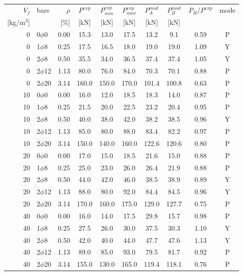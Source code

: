 \begin{tabular}{r l r ccc c cc c}
\toprule
$V_f$ & bars & $\rho$ & $P^{exp}$ & $P^{exp}_{min}$ & $P^{exp}_{max}$ & $P^{mod}_A$ & $P^{mod}_B$ & $P_B/P^{exp}$ & mode\\
{[kg/m$^3$]} & & [\%] & [kN] & [kN] & [kN] & [kN] & [kN] & & \\
\midrule
0 & 0$\phi$0 & 0.00 & 15.3 & 13.0 & 17.5 & 13.2 & 9.1 & 0.59 & P\\
0 & 1$\phi$8 & 0.25 & 17.5 & 16.5 & 18.0 & 19.0 & 19.0 & 1.09 & Y\\
0 & 2$\phi$8 & 0.50 & 35.5 & 34.0 & 36.5 & 37.4 & 37.4 & 1.05 & Y\\
0 & 2$\phi$12 & 1.13 & 80.0 & 76.0 & 84.0 & 70.3 & 70.1 & 0.88 & P\\
0 & 2$\phi$20 & 3.14 & 160.0 & 150.0 & 170.0 & 101.4 & 100.8 & 0.63 & P\\
10 & 0$\phi$0 & 0.00 & 16.0 & 12.0 & 18.5 & 18.3 & 14.0 & 0.87 & P\\
10 & 1$\phi$8 & 0.25 & 21.5 & 20.0 & 22.5 & 23.2 & 20.4 & 0.95 & P\\
10 & 2$\phi$8 & 0.50 & 40.0 & 38.0 & 42.0 & 38.2 & 38.5 & 0.96 & Y\\
10 & 2$\phi$12 & 1.13 & 85.0 & 80.0 & 88.0 & 83.4 & 82.2 & 0.97 & P\\
10 & 2$\phi$20 & 3.14 & 150.0 & 140.0 & 160.0 & 122.6 & 120.6 & 0.80 & P\\
20 & 0$\phi$0 & 0.00 & 17.0 & 15.0 & 18.5 & 21.6 & 15.0 & 0.88 & P\\
20 & 1$\phi$8 & 0.25 & 25.0 & 23.0 & 26.0 & 26.4 & 21.9 & 0.88 & P\\
20 & 2$\phi$8 & 0.50 & 44.0 & 42.0 & 46.0 & 38.5 & 38.9 & 0.89 & Y\\
20 & 2$\phi$12 & 1.13 & 88.0 & 80.0 & 92.0 & 84.4 & 84.5 & 0.96 & Y\\
20 & 2$\phi$20 & 3.14 & 170.0 & 160.0 & 175.0 & 129.0 & 127.7 & 0.75 & P\\
40 & 0$\phi$0 & 0.00 & 16.0 & 14.0 & 17.5 & 29.8 & 15.7 & 0.98 & P\\
40 & 1$\phi$8 & 0.25 & 27.5 & 26.0 & 30.0 & 37.5 & 30.3 & 1.10 & Y\\
40 & 2$\phi$8 & 0.50 & 42.0 & 40.0 & 44.0 & 47.7 & 47.6 & 1.13 & Y\\
40 & 2$\phi$12 & 1.13 & 89.0 & 85.0 & 93.0 & 79.5 & 81.7 & 0.92 & P\\
40 & 2$\phi$20 & 3.14 & 155.0 & 130.0 & 165.0 & 119.4 & 118.1 & 0.76 & P\\
\bottomrule
\end{tabular}
